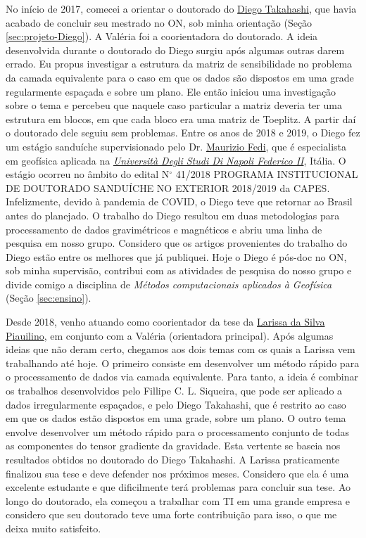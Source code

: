 \bigskip

\noindent No início de 2017, comecei a orientar o doutorado do 
\href{https://lattes.cnpq.br/4939493474727725}{Diego Takahashi}, que havia acabado de
concluir seu mestrado no ON, sob minha orientação (Seção \ref{sec:projeto-Diego}).
A Valéria foi a coorientadora do doutorado.
A ideia desenvolvida durante o doutorado do Diego surgiu após algumas outras darem
errado. Eu propus investigar a estrutura da matriz de sensibilidade no problema da camada
equivalente para o caso em que os dados são dispostos em uma grade regularmente espaçada
e sobre um plano. Ele então iniciou uma investigação sobre o tema e
percebeu que naquele caso particular a matriz deveria ter uma estrutura em blocos,
em que cada bloco era uma matriz de Toeplitz. A partir daí o doutorado dele seguiu
sem problemas. Entre os anos de 2018 e 2019, o Diego fez um estágio sanduíche supervisionado
pelo Dr. \href{https://www.docenti.unina.it/maurizio.fedi}{Maurizio Fedi}, que é
especialista em geofísica aplicada na 
\href{https://www.unina.it/home}{\textit{Università Degli Studi Di Napoli Federico II}}, 
Itália. O estágio ocorreu no âmbito do edital 
N$^{\circ}$ 41/2018 PROGRAMA INSTITUCIONAL DE DOUTORADO SANDUÍCHE NO EXTERIOR 2018/2019
da CAPES. Infelizmente, devido à pandemia de COVID, o Diego teve que retornar ao Brasil
antes do planejado.
O trabalho do Diego resultou em duas metodologias para processamento de dados gravimétricos 
e magnéticos e abriu uma linha de pesquisa em nosso grupo. Considero que os artigos 
provenientes do trabalho do Diego estão entre os melhores que já publiquei.
Hoje o Diego é pós-doc no ON, 
sob minha supervisão, contribui com as atividades de pesquisa do nosso grupo e divide comigo 
a disciplina de \textit{Métodos computacionais aplicados à Geofísica} 
(Seção \ref{sec:ensino}).

\bigskip

\noindent Desde 2018, venho atuando como coorientador da tese da 
\href{https://lattes.cnpq.br/8427378352823905}{Larissa da Silva Piauilino},
em conjunto com a Valéria (orientadora principal). 
Após algumas ideias que não deram certo, chegamos aos dois temas com os quais a Larissa
vem trabalhando até hoje. O primeiro consiste em desenvolver um método rápido para o
processamento de dados via camada 
equivalente. Para tanto, a ideia é combinar os trabalhos desenvolvidos pelo 
Fillipe C. L. Siqueira, que pode ser aplicado a dados irregularmente espaçados, e pelo
Diego Takahashi, que é restrito ao caso em que os dados estão dispostos em uma grade, sobre
um plano. O outro tema envolve desenvolver um método rápido para 
o processamento conjunto de todas as componentes do tensor gradiente da gravidade.
Esta vertente se baseia nos resultados obtidos no doutorado do Diego Takahashi.
A Larissa praticamente finalizou sua tese e deve defender nos próximos meses.
Considero que ela é uma excelente estudante e que dificilmente terá problemas para concluir
sua tese.
Ao longo do doutorado, ela começou a trabalhar com TI em uma grande empresa e considero que
seu doutorado teve uma forte contribuição para isso, o que me deixa muito satisfeito.

